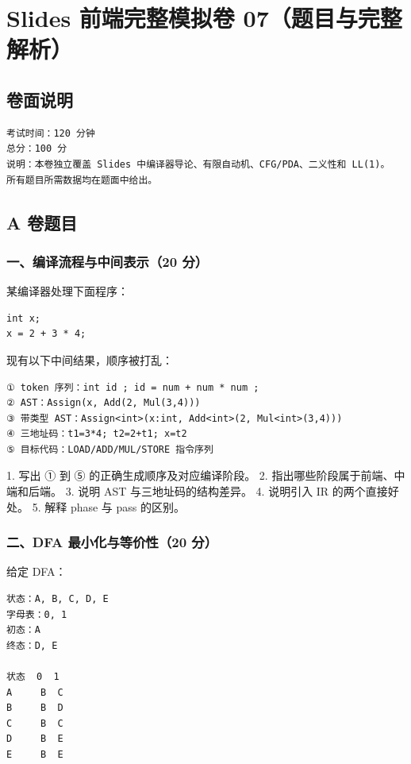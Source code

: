 \documentclass[UTF8]{ctexart}
\begin{document}
\section*{Slides 前端完整模拟卷 07（题目与完整解析）}

\subsection*{卷面说明}

\begin{Verbatim}[fontsize=\small,breaklines=true]
考试时间：120 分钟
总分：100 分
说明：本卷独立覆盖 Slides 中编译器导论、有限自动机、CFG/PDA、二义性和 LL(1)。
所有题目所需数据均在题面中给出。
\end{Verbatim}

\subsection*{A 卷题目}

\subsubsection*{一、编译流程与中间表示（20 分）}

某编译器处理下面程序：

\begin{Verbatim}[fontsize=\small,breaklines=true]
int x;
x = 2 + 3 * 4;
\end{Verbatim}

现有以下中间结果，顺序被打乱：

\begin{Verbatim}[fontsize=\small,breaklines=true]
① token 序列：int id ; id = num + num * num ;
② AST：Assign(x, Add(2, Mul(3,4)))
③ 带类型 AST：Assign<int>(x:int, Add<int>(2, Mul<int>(3,4)))
④ 三地址码：t1=3*4; t2=2+t1; x=t2
⑤ 目标代码：LOAD/ADD/MUL/STORE 指令序列
\end{Verbatim}

1. 写出 ① 到 ⑤ 的正确生成顺序及对应编译阶段。 2. 指出哪些阶段属于前端、中端和后端。 3. 说明 AST 与三地址码的结构差异。 4. 说明引入 IR 的两个直接好处。 5. 解释 phase 与 pass 的区别。

\subsubsection*{二、DFA 最小化与等价性（20 分）}

给定 DFA：

\begin{Verbatim}[fontsize=\small,breaklines=true]
状态：A, B, C, D, E
字母表：0, 1
初态：A
终态：D, E

状态  0  1
A     B  C
B     B  D
C     B  C
D     B  E
E     B  E
\end{Verbatim}
\end{document}
